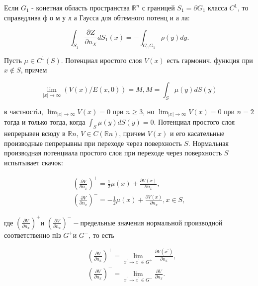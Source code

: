 \documentclass[10pt]{article}
\begin{document}
Если $G_{1}$ - конетная область пространства $\mathbb{R}^{n}$ с границей $S_{1}=\partial G_{1}$ класса $C^{\mathbf{1}}$, то справедлива ф о м у л а Гаусса для обтемного потенц и а ла:



\[

\int_{S_{1}} \frac{\partial Z}{\partial n_{X}} d S_{1}(x)=-\int_{G_{\cap} G_{1}} \rho(y) d y .

\]



Пусть $\mu \in C^{1}(S)$. Потенциал иростого слоя $V(x)$ есть гармонич. функция при $x \notin S$, причем



\[

\lim _{|x| \rightarrow \infty}(V(x) / E(x, 0))=M, M=\int_{S} \mu(y) d S(y)

\]



в частностіл, $\lim _{|x| \rightarrow \infty} V(x)=0$ при $n \geqslant 3$, но $\lim _{|x| \rightarrow \infty} V(x)=0$ при $n=2$ тогда и только тогда, когда $\int_{S} \mu(y) d S(y)=0$. Потенциал простого слоя непрерывен всюду в $\mathbb{R} n$, $V \in C(\mathbb{R} n)$, причем $V(x)$ и его касательные производные пепрерывны при переходе через поверхность $S$. Нормальная производная потенциала простого слоя при переходе через поверхность $S$ испытывает скачок:



\[

\begin{gathered}

\left(\frac{\partial V}{\partial n_{x}}\right)^{+}=\frac{1}{2} \mu(x)+\frac{\partial V(x)}{\partial n_{x}}, \\

\left(\frac{\partial V}{\partial n_{x}}\right)^{-}=-\frac{1}{2} \mu(x)+\frac{\partial V(x)}{\partial n_{x}}, x \in S,

\end{gathered}

\]



где $\left(\frac{\partial V}{\partial n_{x}}\right)^{+}$и $\left(\frac{\partial V}{\partial n_{x}}\right)^{-}-$предельные значения нормальной производной соответственно пІз $G^{+}$и $G^{-}$, то есть



\[

\begin{aligned}

& \left(\frac{\partial V}{\partial n_{x}}\right)^{+}=\lim _{x^{\prime} \rightarrow x^{\prime} \in G^{+}} \frac{\partial V\left(x^{\prime}\right)}{\partial n_{x}}, \\

& \left(\frac{\partial V}{\partial n_{x}}\right)^{-}=\lim _{x^{\prime} \rightarrow x^{\prime} \in G^{-}} \frac{\partial V}{\partial n_{x}} .

\end{aligned}

\]
\end{document}
